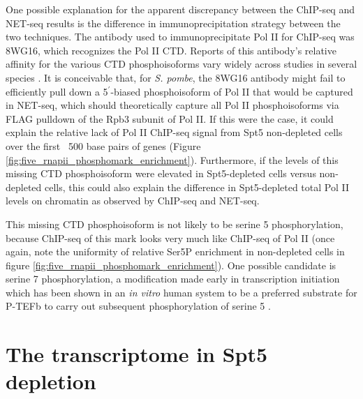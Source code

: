 One possible explanation for the apparent discrepancy between the ChIP-seq and NET-seq results is the difference in immunoprecipitation strategy between the two techniques.
The antibody used to immunoprecipitate Pol II for ChIP-seq was 8WG16, which recognizes the Pol II CTD.
Reports of this antibody's relative affinity for the various CTD phosphoisoforms vary widely across studies in several species \citep{zeitlinger2007}.
It is conceivable that, for \textit{S. pombe}, the 8WG16 antibody might fail to efficiently pull down a 5$^\prime$-biased phosphoisoform of Pol II that would be captured in NET-seq, which should theoretically capture all Pol II phosphoisoforms via FLAG pulldown of the Rpb3 subunit of Pol II.
If this were the case, it could explain the relative lack of Pol II ChIP-seq signal from Spt5 non-depleted cells over the first ~500 base pairs of genes (Figure \ref{fig:five_rnapii_phosphomark_enrichment}).
Furthermore, if the levels of this missing CTD phosphoisoform were elevated in Spt5-depleted cells versus non-depleted cells, this could also explain the difference in Spt5-depleted total Pol II levels on chromatin as observed by ChIP-seq and NET-seq.

This missing CTD phosphoisoform is not likely to be serine 5 phosphorylation, because ChIP-seq of this mark looks very much like ChIP-seq of Pol II (once again, note the uniformity of relative Ser5P enrichment in non-depleted cells in figure \ref{fig:five_rnapii_phosphomark_enrichment}).
One possible candidate is serine 7 phosphorylation, a modification made early in transcription initiation which has been shown in an \textit{in vitro} human system to be a preferred substrate for P-TEFb to carry out subsequent phosphorylation of serine 5 \citep{czudnochowski2012}.

\section{The transcriptome in Spt5 depletion}
\label{sec:five_transcriptome}


